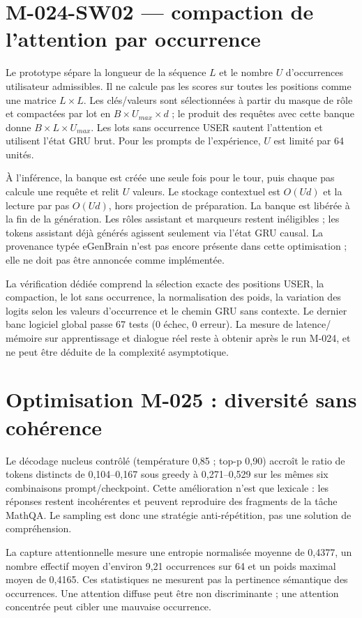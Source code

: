 \documentclass[11pt,a4paper]{report}
\begin{document}
\section*{M-024-SW02 — compaction de l'attention par occurrence}
Le prototype sépare la longueur de la séquence $L$ et le nombre $U$ d'occurrences utilisateur admissibles. Il ne calcule pas les scores sur toutes les positions comme une matrice $L\times L$. Les clés/valeurs sont sélectionnées à partir du masque de rôle et compactées par lot en $B\times U_{max}\times d$ ; le produit des requêtes avec cette banque donne $B\times L\times U_{max}$. Les lots sans occurrence USER sautent l'attention et utilisent l'état GRU brut. Pour les prompts de l'expérience, $U$ est limité par 64 unités.

À l'inférence, la banque est créée une seule fois pour le tour, puis chaque pas calcule une requête et relit $U$ valeurs. Le stockage contextuel est $O(Ud)$ et la lecture par pas $O(Ud)$, hors projection de préparation. La banque est libérée à la fin de la génération. Les rôles assistant et marqueurs restent inéligibles ; les tokens assistant déjà générés agissent seulement via l'état GRU causal. La provenance typée eGenBrain n'est pas encore présente dans cette optimisation ; elle ne doit pas être annoncée comme implémentée.

La vérification dédiée comprend la sélection exacte des positions USER, la compaction, le lot sans occurrence, la normalisation des poids, la variation des logits selon les valeurs d'occurrence et le chemin GRU sans contexte. Le dernier banc logiciel global passe 67 tests (0 échec, 0 erreur). La mesure de latence/ mémoire sur apprentissage et dialogue réel reste à obtenir après le run M-024, et ne peut être déduite de la complexité asymptotique.


\section{Optimisation M-025 : diversité sans cohérence}
Le décodage nucleus contrôlé (température 0,85 ; top-p 0,90) accroît le ratio de tokens distincts de 0,104--0,167 sous greedy à 0,271--0,529 sur les mêmes six combinaisons prompt/checkpoint. Cette amélioration n'est que lexicale : les réponses restent incohérentes et peuvent reproduire des fragments de la tâche MathQA. Le sampling est donc une stratégie anti-répétition, pas une solution de compréhension.

La capture attentionnelle mesure une entropie normalisée moyenne de 0,4377, un nombre effectif moyen d'environ 9,21 occurrences sur 64 et un poids maximal moyen de 0,4165. Ces statistiques ne mesurent pas la pertinence sémantique des occurrences. Une attention diffuse peut être non discriminante ; une attention concentrée peut cibler une mauvaise occurrence.
\end{document}
